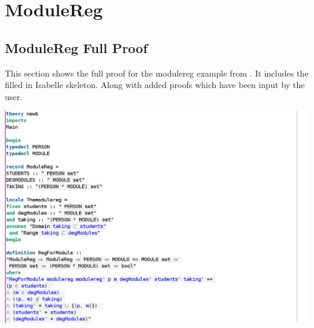 %
%
%
%


\section{ModuleReg}
\label{app:moduleregfullproof}

\subsection{ModuleReg Full Proof}

This section shows the full proof for the modulereg example from \cite{essenceofz}. It includes the filled in Isabelle skeleton. Along with added proofs which have been input by the user.

\noindent \includegraphics[scale=0.5]{examples/modulereg/6imagea.png}

